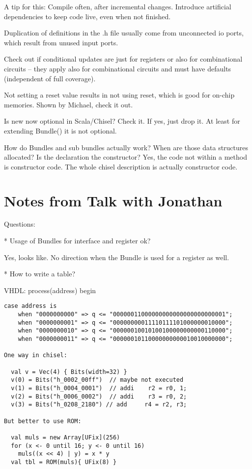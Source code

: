 \documentclass[a4paper, conference]{IEEEtran}
\begin{document}
A tip for this: Compile often, after incremental changes. Introduce artificial
dependencies to keep code live, even when not finished.

Duplication of definitions in the .h file usually come from unconnected
io ports, which result from unused input ports.

Check out if conditional updates are just for registers or also for combinational circuits
-- they apply also for combinational circuits and must have defaults (independent of
full coverage).

Not setting a reset value results in not using reset, which is good for on-chip memories. Shown by Michael, check it out.

Is new now optional in Scala/Chisel? Check it. If yes, just drop it. At least for extending Bundle()
it is not optional.

How do Bundles and sub bundles actually work? When are those data structures allocated?
Is the declaration the constructor? Yes, the code not within a method is constructor code.
The whole chisel description is actually constructor code.

\section{Notes from Talk with Jonathan}

Questions:

* Usage of Bundles for interface and register ok?

Yes, looks like. No direction when the Bundle is used for a register as well.

* How to write a table?

VHDL:
process(address) begin

\begin{verbatim}
case address is
    when "0000000000" => q <= "00000011000000000000000000000001";
    when "0000000001" => q <= "00000000011110111101000000010000";
    when "0000000010" => q <= "00000010010100100000000000110000";
    when "0000000011" => q <= "00000010110000000000010010000000";

One way in chisel:

  val v = Vec(4) { Bits(width=32) }
  v(0) = Bits("h_0002_00ff")  // maybe not executed
  v(1) = Bits("h_0004_0001")  // addi    r2 = r0, 1;
  v(2) = Bits("h_0006_0002")  // addi    r3 = r0, 2;
  v(3) = Bits("h_0208_2180") // add     r4 = r2, r3;

But better to use ROM:

  val muls = new Array[UFix](256)
  for (x <- 0 until 16; y <- 0 until 16)
    muls((x << 4) | y) = x * y
  val tbl = ROM(muls){ UFix(8) }

\end{verbatim}
\end{document}
